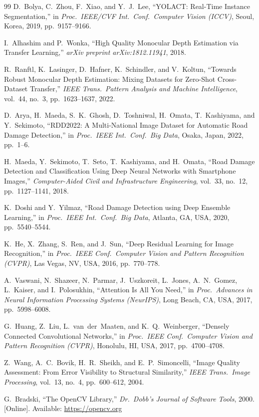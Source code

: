 \documentclass[conference]{IEEEtran}
\begin{document}
\begin{thebibliography}{99}
D.~Bolya, C.~Zhou, F.~Xiao, and Y.~J.~Lee, ``YOLACT: Real-Time Instance Segmentation,'' in \textit{Proc.\ IEEE/CVF Int.\ Conf.\ Computer Vision (ICCV)}, Seoul, Korea, 2019, pp.~9157--9166.

I.~Alhashim and P.~Wonka, ``High Quality Monocular Depth Estimation via Transfer Learning,'' \textit{arXiv preprint arXiv:1812.11941}, 2018.

R.~Ranftl, K.~Lasinger, D.~Hafner, K.~Schindler, and V.~Koltun, ``Towards Robust Monocular Depth Estimation: Mixing Datasets for Zero-Shot Cross-Dataset Transfer,'' \textit{IEEE Trans.\ Pattern Analysis and Machine Intelligence}, vol.~44, no.~3, pp.~1623--1637, 2022.

D.~Arya, H.~Maeda, S.~K.~Ghosh, D.~Toshniwal, H.~Omata, T.~Kashiyama, and Y.~Sekimoto, ``RDD2022: A Multi-National Image Dataset for Automatic Road Damage Detection,'' in \textit{Proc.\ IEEE Int.\ Conf.\ Big Data}, Osaka, Japan, 2022, pp.~1--6.

H.~Maeda, Y.~Sekimoto, T.~Seto, T.~Kashiyama, and H.~Omata, ``Road Damage Detection and Classification Using Deep Neural Networks with Smartphone Images,'' \textit{Computer-Aided Civil and Infrastructure Engineering}, vol.~33, no.~12, pp.~1127--1141, 2018.

K.~Doshi and Y.~Yilmaz, ``Road Damage Detection using Deep Ensemble Learning,'' in \textit{Proc.\ IEEE Int.\ Conf.\ Big Data}, Atlanta, GA, USA, 2020, pp.~5540--5544.

K.~He, X.~Zhang, S.~Ren, and J.~Sun, ``Deep Residual Learning for Image Recognition,'' in \textit{Proc.\ IEEE Conf.\ Computer Vision and Pattern Recognition (CVPR)}, Las Vegas, NV, USA, 2016, pp.~770--778.

A.~Vaswani, N.~Shazeer, N.~Parmar, J.~Uszkoreit, L.~Jones, A.~N.~Gomez, L.~Kaiser, and I.~Polosukhin, ``Attention Is All You Need,'' in \textit{Proc.\ Advances in Neural Information Processing Systems (NeurIPS)}, Long Beach, CA, USA, 2017, pp.~5998--6008.

G.~Huang, Z.~Liu, L.~van~der~Maaten, and K.~Q.~Weinberger, ``Densely Connected Convolutional Networks,'' in \textit{Proc.\ IEEE Conf.\ Computer Vision and Pattern Recognition (CVPR)}, Honolulu, HI, USA, 2017, pp.~4700--4708.

Z.~Wang, A.~C.~Bovik, H.~R.~Sheikh, and E.~P.~Simoncelli, ``Image Quality Assessment: From Error Visibility to Structural Similarity,'' \textit{IEEE Trans.\ Image Processing}, vol.~13, no.~4, pp.~600--612, 2004.

G.~Bradski, ``The OpenCV Library,'' \textit{Dr.\ Dobb's Journal of Software Tools}, 2000. [Online]. Available: \url{https://opencv.org}

\end{thebibliography}
\end{document}
